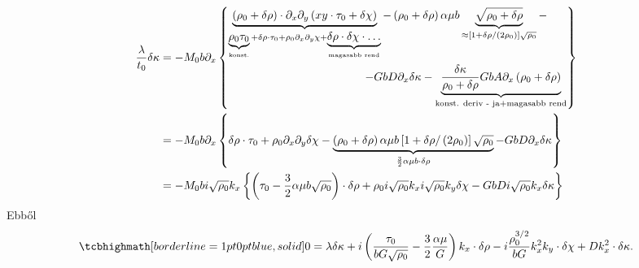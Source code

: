 \documentclass[10pt,a4paper]{scrartcl}
\begin{document}
\[\begin{aligned}
  \frac{\lambda }{{{t_0}}}\delta\kappa  &  =  - {M_0}b{\partial _x}\left\{ \begin{gathered}
  \underbrace {\left( {{\rho _0} + \delta \rho } \right) \cdot {\partial _x}{\partial _y}\left( {xy \cdot {\tau _0} + \delta \chi } \right)}_{\underbrace {{\rho _0}{\tau _0}}_{{\text{konst}}{\text{.}}} + \delta \rho  \cdot {\tau _0} + {\rho _0}{\partial _x}{\partial _y}\chi  + \underbrace {\delta \rho  \cdot \delta \chi  \cdot  \ldots }_{{\text{magasabb rend}}}} - \left( {{\rho _0} + \delta \rho } \right)\alpha \mu b\underbrace {\sqrt {{\rho _0} + \delta \rho } }_{ \approx \left[ {1 + \delta \rho /\left( {2{\rho _0}} \right)} \right]\sqrt {{\rho _0}} } -  \hfill \\
  \quad \quad \quad \quad \quad \quad \quad \quad \quad \quad \quad \quad  - GbD{\partial _x}\delta\kappa  - \underbrace {\frac{{\delta \kappa }}{{{\rho _0} + \delta \rho }}GbA{\partial _x}\left( {{\rho _0} + \delta \rho } \right)}_{{\text{konst}}{\text{. deriv - ja}} + {\text{magasabb rend}}} \hfill \\ 
\end{gathered}  \right\} \\ 
   & =  - {M_0}b{\partial _x}\left\{ {\delta \rho  \cdot {\tau _0} + {\rho _0}{\partial _x}{\partial _y}\delta \chi  - \underbrace {\left( {{\rho _0} + \delta \rho } \right)\alpha \mu b\left[ {1 + \delta \rho /\left( {2{\rho _0}} \right)} \right]\sqrt {{\rho _0}} }_{\frac{3}{2}\alpha \mu b \cdot \delta \rho } - GbD{\partial _x}\delta \kappa } \right\} \\ 
   &  =   - {M_0}bi\sqrt {{\rho _0}} {k_x}\left\{ {\left( {{\tau _0} - \frac{3}{2}\alpha \mu b\sqrt {{\rho _0}} } \right) \cdot \delta \rho  + {\rho _0}i\sqrt {{\rho _0}} {k_x}i\sqrt {{\rho _0}} {k_y}\delta \chi  - GbDi\sqrt {{\rho _0}} {k_x}\delta \kappa } \right\} \\ 
\end{aligned} \]
Ebből
\begin{equation} \label{eq:lin_ed_kappa}
\tcbhighmath[borderline={1pt}{0pt}{blue,solid}]{
0 = \lambda \delta \kappa  + i\left( {\frac{{{\tau _0}}}{{bG\sqrt {{\rho _0}} }} - \frac{3}{2}\frac{{\alpha \mu }}{G}} \right){k_x} \cdot \delta \rho  - i\frac{{\rho _0^{3/2}}}{{bG}}k_x^2{k_y} \cdot \delta \chi  + Dk_x^2 \cdot \delta \kappa .}
\end{equation}
\end{document}
